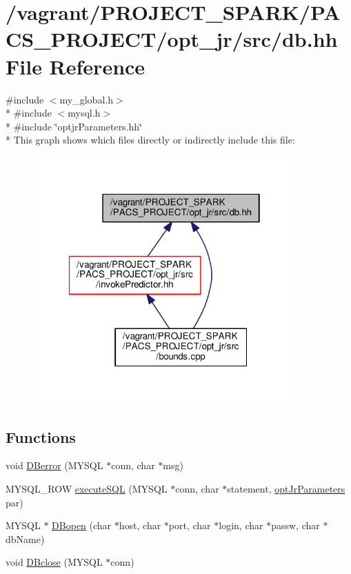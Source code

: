\hypertarget{db_8hh}{\section{/vagrant/\-P\-R\-O\-J\-E\-C\-T\-\_\-\-S\-P\-A\-R\-K/\-P\-A\-C\-S\-\_\-\-P\-R\-O\-J\-E\-C\-T/opt\-\_\-jr/src/db.hh File Reference}
\label{db_8hh}
}
{\ttfamily \#include $<$my\-\_\-global.\-h$>$}\\*
{\ttfamily \#include $<$mysql.\-h$>$}\\*
{\ttfamily \#include \char`\"{}optjr\-Parameters.\-hh\char`\"{}}\\*
This graph shows which files directly or indirectly include this file\-:\nopagebreak
\begin{figure}[H]
\begin{center}
\leavevmode
\includegraphics[width=286pt]{db_8hh__dep__incl}
\end{center}
\end{figure}
\subsection*{Functions}
\begin{DoxyCompactItemize}
\item 
void \hyperlink{db_8hh_ab33dd75bdc4f92249542a2bb81b343fd}{D\-Berror} (M\-Y\-S\-Q\-L $\ast$conn, char $\ast$msg)
\item 
M\-Y\-S\-Q\-L\-\_\-\-R\-O\-W \hyperlink{db_8hh_a2491baf1bdfde4dc81303042399a6278}{execute\-S\-Q\-L} (M\-Y\-S\-Q\-L $\ast$conn, char $\ast$statement, \hyperlink{classoptJrParameters}{opt\-Jr\-Parameters} par)
\item 
M\-Y\-S\-Q\-L $\ast$ \hyperlink{db_8hh_aced0f518cdbba35b17b3ce9f316131ce}{D\-Bopen} (char $\ast$host, char $\ast$port, char $\ast$login, char $\ast$passw, char $\ast$db\-Name)
\item 
void \hyperlink{db_8hh_a54af21d55b55bae7b63cb28d3cd05758}{D\-Bclose} (M\-Y\-S\-Q\-L $\ast$conn)
\end{DoxyCompactItemize}


